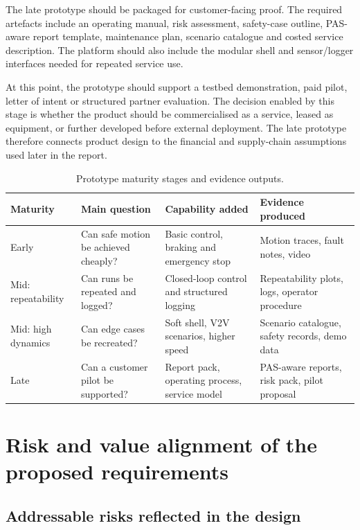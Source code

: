 The late prototype should be packaged for customer-facing proof. The required artefacts include an operating manual, risk assessment, safety-case outline, PAS-aware report template, maintenance plan, scenario catalogue and costed service description. The platform should also include the modular shell and sensor/logger interfaces needed for repeated service use.

At this point, the prototype should support a testbed demonstration, paid pilot, letter of intent or structured partner evaluation. The decision enabled by this stage is whether the product should be commercialised as a service, leased as equipment, or further developed before external deployment. The late prototype therefore connects product design to the financial and supply-chain assumptions used later in the report.

\begin{table}[H]
\centering
\caption{Prototype maturity stages and evidence outputs.}
\label{tab:ch8_prototype_stages}
\begin{tabular}{p{}p{}p{}p{}}
\toprule
\textbf{Maturity} & \textbf{Main question} & \textbf{Capability added} & \textbf{Evidence produced} \\
\midrule
Early & Can safe motion be achieved cheaply? & Basic control, braking and emergency stop & Motion traces, fault notes, video \\
\midrule
Mid: repeatability & Can runs be repeated and logged? & Closed-loop control and structured logging & Repeatability plots, logs, operator procedure \\
\midrule
Mid: high dynamics & Can edge cases be recreated? & Soft shell, V2V scenarios, higher speed & Scenario catalogue, safety records, demo data \\
\midrule
Late & Can a customer pilot be supported? & Report pack, operating process, service model & PAS-aware reports, risk pack, pilot proposal \\
\bottomrule
\end{tabular}
\end{table}

\section{Risk and value alignment of the proposed requirements}
\label{sec:ch8_risk_value_alignment}

\subsection{Addressable risks reflected in the design}
\label{sec:ch8_addressable_risks}

